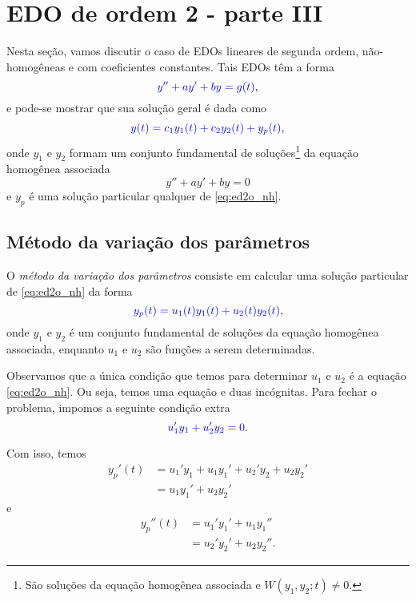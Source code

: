 \section{EDO de ordem 2 - parte III}\label{cap_edolin_sec_edo2III}

Nesta seção, vamos discutir o caso de EDOs lineares de segunda ordem, não-homogêneas e com coeficientes constantes. Tais EDOs têm a forma
\begin{equation}\label{eq:ed2o_nh}
  {\color{blue}y'' + ay' + by = g(t)},
\end{equation}
e pode-se mostrar que sua solução geral é dada como
\begin{equation}
  {\color{blue}y(t) = c_1y_1(t) + c_2y_2(t) + y_p(t)},
\end{equation}
onde $y_1$ e $y_2$ formam um conjunto fundamental de soluções\footnote{São soluções da equação homogênea associada e $W(y_1,y_2;t)\neq 0$.} da equação homogênea associada
\begin{equation}
  y'' + ay' + by = 0
\end{equation}
e $y_p$ é uma solução particular qualquer de \eqref{eq:ed2o_nh}.

\subsection{Método da variação dos parâmetros}

O \emph{método da variação dos parâmetros} consiste em calcular uma solução particular de \eqref{eq:ed2o_nh} da forma
\begin{equation}
  {\color{blue}y_p(t) = u_1(t)y_1(t) + u_2(t)y_2(t)},
\end{equation}
onde $y_1$ e $y_2$ é um conjunto fundamental de soluções da equação homogênea associada, enquanto $u_1$ e $u_2$ são funções a serem determinadas.

Observamos que a única condição que temos para determinar $u_1$ e $u_2$ é a equação \eqref{eq:ed2o_nh}. Ou seja, temos uma equação e duas incógnitas. Para fechar o problema, impomos a seguinte condição extra
\begin{equation}\label{eq:ed2o_nh_mv_1}
  {\color{blue}u_1'y_1 + u_2'y_2 = 0}.
\end{equation}

Com isso, temos
\begin{align}
  y_p'(t) &=  u_1'y_1 + u_1y_1' + u_2'y_2 + u_2y_2' \\
          &= u_1y_1' + u_2y_2'
\end{align}
e
\begin{align}
  y_p''(t) &= u_1'y_1' + u_1y_1'' \\
           &= u_2'y_2' + u_2y_2''.
\end{align}

